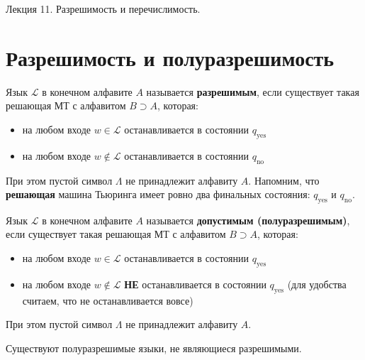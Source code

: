 \documentclass[11pt]{article}
\begin{document}
\begin{titlepage}
    \centering
    \vspace*{\fill}  %

    {\Huge Лекция 11. Разрешимость и перечислимость.
    \par}

    \vspace*{\fill}  %
\end{titlepage}

\setcounter{page}{1}

\section{Разрешимость и полуразрешимость}

\begin{definition}
    Язык $\mathcal{L}$ в конечном алфавите $A$ называется \textbf{разрешимым}, если существует такая решающая МТ с алфавитом $B \supset A$, которая:
    \begin{itemize}
        \item на любом входе $w \in \mathcal{L}$ останавливается в состоянии $q_{\text{yes}}$
        \item на любом входе $w \not \in \mathcal{L}$ останавливается в состоянии $q_{\text{no}}$
    \end{itemize}
    При этом пустой символ $\Lambda$ не принадлежит алфавиту $A$. Напомним, что \textbf{решающая} машина Тьюринга имеет ровно два финальных состояния: $q_{\text{yes}}$ и $q_{\text{no}}$.
\end{definition}

\begin{definition}
    Язык $\mathcal{L}$ в конечном алфавите $A$ называется \textbf{допустимым (полуразрешимым)}, если существует такая решающая МТ с алфавитом $B \supset A$, которая:
    \begin{itemize}
        \item на любом входе $w \in \mathcal{L}$ останавливается в состоянии $q_{\text{yes}}$
        \item на любом входе $w \not \in \mathcal{L}$ \textbf{НЕ} останавливается в состоянии $q_{\text{yes}}$ (для удобства считаем, что не останавливается вовсе)
    \end{itemize}
    При этом пустой символ $\Lambda$ не принадлежит алфавиту $A$.
\end{definition}

\begin{lemma}
    Существуют полуразрешимые языки, не являющиеся разрешимыми.
\end{lemma}
\end{document}

